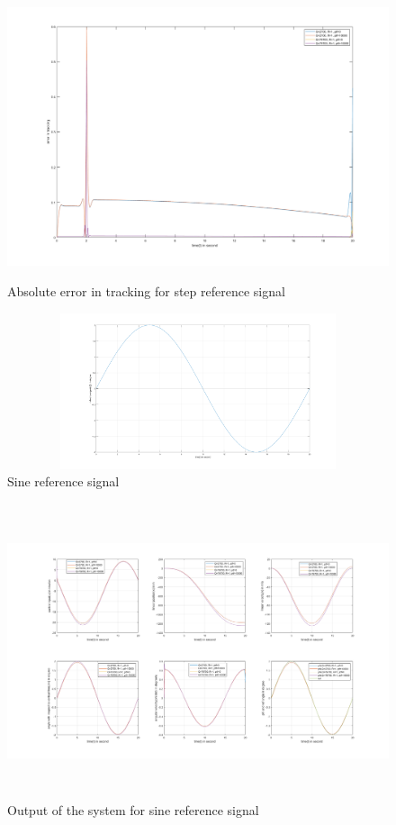 \documentclass[12pt]{article}
\begin{document}
\newpage
\begin{figure}[h]
	\centering
	\includegraphics[height=3.3in,width=5.5in]{step_error.png}
	\caption{Absolute error in tracking for step reference signal}
	\label{fig:step_error}
\end{figure}
\vspace{2cm}
\begin{figure}[h]
	\centering
	\includegraphics[height=1.8in,width=5.5in]{sin_ref.png}
	\caption{Sine reference signal}
	\label{fig:sin-ref}
\end{figure}
\newpage
\begin{figure}[h]
	\centering
	\includegraphics[height=3.4in,width=5.5in]{sin_output.png}
	\caption{Output of the system for sine reference signal}
	\label{fig:sin_output}
\end{figure}
\end{document}
